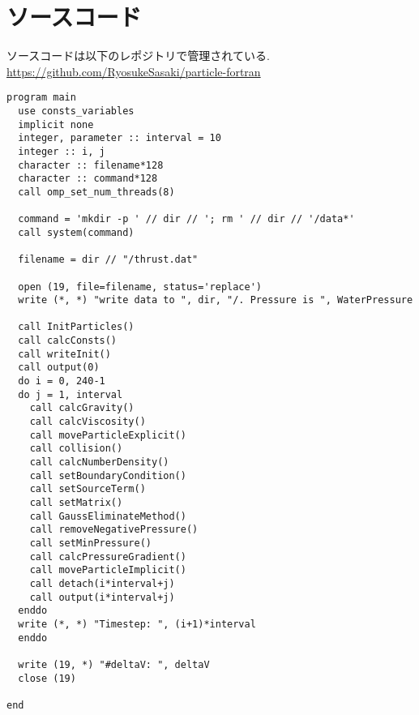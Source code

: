 \appendix
\section{ソースコード}
ソースコードは以下のレポジトリで管理されている.\\
\url{https://github.com/RyosukeSasaki/particle-fortran}
\begin{lstlisting}[caption=メインプログラム]
program main
  use consts_variables
  implicit none
  integer, parameter :: interval = 10
  integer :: i, j
  character :: filename*128
  character :: command*128
  call omp_set_num_threads(8)

  command = 'mkdir -p ' // dir // '; rm ' // dir // '/data*'
  call system(command) 

  filename = dir // "/thrust.dat"

  open (19, file=filename, status='replace')
  write (*, *) "write data to ", dir, "/. Pressure is ", WaterPressure

  call InitParticles()
  call calcConsts()
  call writeInit()
  call output(0)
  do i = 0, 240-1
  do j = 1, interval
    call calcGravity()
    call calcViscosity()
    call moveParticleExplicit()
    call collision()
    call calcNumberDensity()
    call setBoundaryCondition()
    call setSourceTerm()
    call setMatrix()
    call GaussEliminateMethod()
    call removeNegativePressure()
    call setMinPressure()
    call calcPressureGradient()
    call moveParticleImplicit()
    call detach(i*interval+j)
    call output(i*interval+j)
  enddo
  write (*, *) "Timestep: ", (i+1)*interval
  enddo

  write (19, *) "#deltaV: ", deltaV
  close (19)

end
\end{lstlisting}






